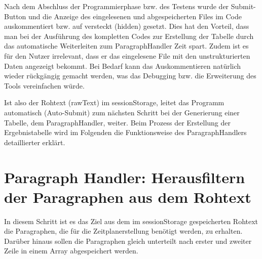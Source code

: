 { Nach dem Abschluss der Programmierphase bzw. des Testens wurde der Submit-Button und die Anzeige des eingelesenen und abgespeicherten Files im Code auskommentiert bzw. auf versteckt (hidden) gesetzt. Dies hat den Vorteil, dass man bei der Ausführung des kompletten Codes zur Erstellung der Tabelle durch das automatische Weiterleiten zum ParagraphHandler Zeit spart. Zudem ist es für den Nutzer irrelevant, dass er das eingelesene File mit den unstrukturierten Daten angezeigt bekommt. Bei Bedarf kann das Auskommentieren natürlich wieder rückgängig gemacht werden, was das Debugging bzw. die Erweiterung des Tools vereinfachen würde. 

Ist also der Rohtext (rawText) im sessionStorage, leitet das Programm automatisch (Auto-Submit) zum nächsten Schritt bei der Generierung einer Tabelle, dem ParagraphHandler, weiter. Beim Prozess der Erstellung der Ergebnistabelle wird im Folgenden die Funktionsweise des ParagraphHandlers detaillierter erklärt.

\section{Paragraph Handler: Herausfiltern der Paragraphen aus dem Rohtext}

In diesem Schritt ist es das Ziel aus dem im sessionStorage gespeicherten Rohtext die Paragraphen, die für die Zeitplanerstellung benötigt werden, zu erhalten. Darüber hinaus sollen die Paragraphen gleich unterteilt nach erster und zweiter Zeile in einem Array abgespeichert werden.

}
